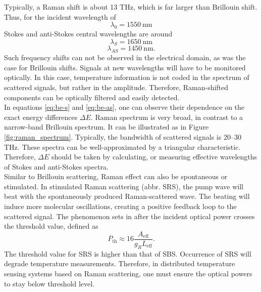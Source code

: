 \documentclass{standalone}
\begin{document}
Typically, a Raman shift is about 13 THz, which is far larger than Brillouin shift. Thus, for the incident wavelength of
\begin{equation}
\lambda_0 = \SI{1550}{\nano \meter}
\end{equation}
Stokes and anti-Stokes central wavelengths are around
\begin{equation}
\lambda_S = \SI{1650}{\nano \meter}
\end{equation}
\begin{equation}
\lambda_{AS} = \SI{1450}{\nano \meter} \textrm{.}
\end{equation}
Such frequency shifts can not be observed in the electrical domain, as was the case for Brillouin shifts. Signals at new wavelengths will have to be monitored optically. In this case, temperature information is not coded in the spectrum of scattered signals, but rather in the amplitude. Therefore, Raman-shifted components can be optically filtered and easily detected. \\

In equations \ref{eq:be-s} and \ref{eq:be-as}, one can observe their dependence on the exact energy differences $\varDelta E$. Raman spectrum is very broad, in contrast to a narrow-band Brillouin spectrum. It can be illustrated as in Figure \ref{fig:raman_spectrum}.
Typically, the bandwidth of scattered signals is 20--30 THz. These spectra can be well-approximated by a triangular characteristic. Therefore, $\varDelta E$ should be taken by calculating, or measuring effective wavelengths of Stokes and anti-Stokes spectra. \\

Similar to Brillouin scattering, Raman effect can also be spontaneous or stimulated. In stimulated Raman scattering (abbr. SRS), the pump wave will beat with the spontaneously produced Raman-scattered wave. The beating will induce more molecular oscillations, creating a positive feedback loop to the scattered signal. The phenomenon sets in after the incident optical power crosses the threshold value, defined as
\begin{equation}
P_\textrm{th} \approx 16 \frac{A_\textrm{eff}}{g_R L_\textrm{eff}} \textrm{.}
\end{equation}
The threshold value for SRS is higher than that of SBS. Occurrence of SRS will degrade temperature measurements. Therefore, in distributed temperature sensing systems based on Raman scattering, one must ensure the optical powers to stay below threshold level.




\setcounter{stranica}{\thepage}
\addtocounter{stranica}{1}
\end{document}
